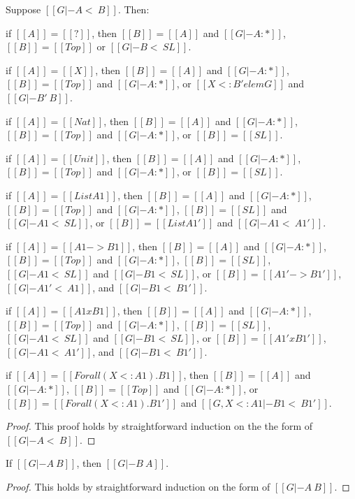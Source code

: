 \begin{lemma}
  \label{lemma:inversion_of_consistent_subtyping}
  Suppose $[[G |- A <~ B]]$. Then:
  \begin{enumR}\small
  \item if $[[A]] = [[?]]$, then
    $[[B]] = [[A]]$ and $[[G |- A : *]]$, $[[B]] = [[Top]]$ or $[[G |- B <~ SL]]$.
  \item if $[[A]] = [[X]]$, then
    $[[B]] = [[A]]$ and $[[G |- A : *]]$, $[[B]] = [[Top]]$ and $[[G |- A : *]]$, or $[[X <: B' elem G]]$ and $[[G |- B' ~ B]]$.
  \item if $[[A]] = [[Nat]]$, then
    $[[B]] = [[A]]$ and $[[G |- A : *]]$, $[[B]] = [[Top]]$ and $[[G |- A : *]]$, or $[[B]] = [[SL]]$.
  \item if $[[A]] = [[Unit]]$, then
    $[[B]] = [[A]]$ and $[[G |- A : *]]$, $[[B]] = [[Top]]$ and $[[G |- A : *]]$, or $[[B]] = [[SL]]$.
  \item if $[[A]] = [[List A1]]$, then
    $[[B]] = [[A]]$ and $[[G |- A : *]]$, $[[B]] = [[Top]]$ and $[[G |- A : *]]$, $[[B]] = [[SL]]$ and $[[G |- A1 <~ SL]]$,
    or $[[B]] = [[List A1']]$ and $[[G |- A1 <~ A1']]$.
  \item if $[[A]] = [[A1 -> B1]]$, then
    $[[B]] = [[A]]$ and $[[G |- A : *]]$, $[[B]] = [[Top]]$ and $[[G |- A : *]]$, $[[B]] = [[SL]]$, $[[G |- A1 <~ SL]]$ and
    $[[G |- B1 <~ SL]]$, or $[[B]] = [[A1' -> B1']]$, $[[G |- A1' <~ A1]]$, and $[[G |- B1 <~ B1']]$.
  \item if $[[A]] = [[A1 x B1]]$, then
    $[[B]] = [[A]]$ and $[[G |- A : *]]$, $[[B]] = [[Top]]$ and $[[G |- A : *]]$, $[[B]] = [[SL]]$, $[[G |- A1 <~ SL]]$ and
    $[[G |- B1 <~ SL]]$, or $[[B]] = [[A1' x B1']]$, $[[G |- A1 <~ A1']]$, and $[[G |- B1 <~ B1']]$.
  \item if $[[A]] = [[Forall (X <: A1).B1]]$, then
    $[[B]] = [[A]]$ and $[[G |- A : *]]$, $[[B]] = [[Top]]$ and $[[G |- A : *]]$,
    or $[[B]] = [[Forall (X <: A1).B1']]$ and $[[G, X <: A1 |- B1 <~ B1']]$.
  \end{enumR}
\end{lemma}
\begin{proof}
  This proof holds by straightforward induction on the the form of $[[G |- A <~ B]]$.
\end{proof}

\begin{lemma}
  \label{lemma:symmetry_for_type_consistency}
  If $[[G |- A ~ B]]$, then $[[G |- B ~ A]]$.
\end{lemma}
\begin{proof}
  This holds by straightforward induction on the form of $[[G |- A ~ B]]$.
\end{proof}

